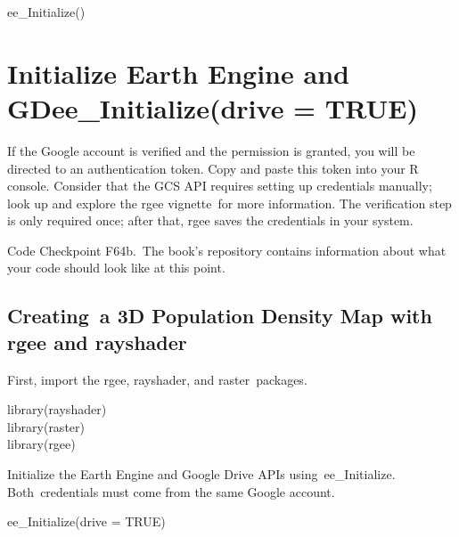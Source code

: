 \documentclass[
  letterpaper,
  DIV=11,
  numbers=noendperiod]{scrreprt}
\begin{document}
ee\_Initialize()

\hypertarget{initialize-earth-engine-and-gdee_initializedrive-true}{%
\chapter{Initialize Earth Engine and GDee\_Initialize(drive =
TRUE)}\label{initialize-earth-engine-and-gdee_initializedrive-true}}

If the Google account is verified and the permission is granted, you
will be directed to an authentication token. Copy and paste this token
into your R console. Consider that the GCS API requires setting up
credentials manually; look up and explore the rgee vignette~for more
information. The verification step is only required once; after that,
rgee saves the credentials in your system.

\begin{tcolorbox}[enhanced jigsaw, left=2mm, breakable, rightrule=.15mm, opacityback=0, colframe=quarto-callout-note-color-frame, colbacktitle=quarto-callout-note-color!10!white, arc=.35mm, opacitybacktitle=0.6, toptitle=1mm, colback=white, leftrule=.75mm, title=\textcolor{quarto-callout-note-color}{\faInfo}\hspace{0.5em}{Note}, toprule=.15mm, bottomtitle=1mm, titlerule=0mm, bottomrule=.15mm, coltitle=black]

Code Checkpoint F64b.~The book's repository contains information about
what your code should look like at this point.

\end{tcolorbox}

\hypertarget{creating-a-3d-population-density-map-with-rgee-and-rayshader}{%
\section{Creating~a 3D Population Density Map with rgee and
rayshader}\label{creating-a-3d-population-density-map-with-rgee-and-rayshader}}

First, import the rgee, rayshader, and raster~packages.

library(rayshader)\\
library(raster)\\
library(rgee)

Initialize the Earth Engine and Google Drive APIs using~ee\_Initialize.
Both~credentials must come from the same Google account.

ee\_Initialize(drive = TRUE)
\end{document}
